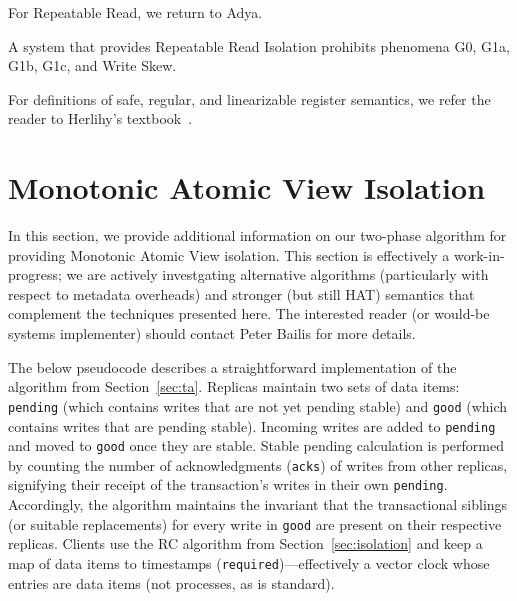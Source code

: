 For Repeatable Read, we return to Adya.

\begin{definition}
A system that provides Repeatable Read Isolation prohibits phenomena
G0, G1a, G1b, G1c, and Write Skew.
\end{definition}

For definitions of safe, regular, and linearizable register semantics,
we refer the reader to Herlihy's textbook~\cite{herlihy-art}.

\section{Monotonic Atomic View Isolation}

In this section, we provide additional information on our two-phase
algorithm for providing Monotonic Atomic View isolation. This section
is effectively a work-in-progress; we are actively investgating
alternative algorithms (particularly with respect to metadata
overheads) and stronger (but still HAT) semantics that complement the
techniques presented here. The interested reader (or would-be systems
implementer) should contact Peter Bailis for more details.

The below pseudocode describes a straightforward implementation of the
algorithm from Section~\ref{sec:ta}. Replicas maintain two sets of
data items: \texttt{pending} (which contains writes that are not yet
pending stable) and \texttt{good} (which contains writes that are
pending stable). Incoming writes are added to \texttt{pending} and
moved to \texttt{good} once they are stable. Stable pending
calculation is performed by counting the number of acknowledgments
(\texttt{acks}) of writes from other replicas, signifying their
receipt of the transaction's writes in their
own \texttt{pending}. Accordingly, the algorithm maintains the
invariant that the transactional siblings (or suitable replacements)
for every write in \texttt{good} are present on their respective
replicas. Clients use the RC algorithm from
Section~\ref{sec:isolation} and keep a map of data items to timestamps
(\texttt{required})---effectively a vector clock whose entries are
data items (not processes, as is standard).

